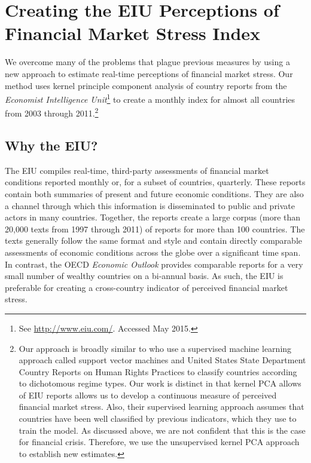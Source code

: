 \documentclass[]{article}
\begin{document}
\section{Creating the EIU Perceptions of Financial Market Stress
Index}\label{creating-the-perceptions-of-financial-market-stress-index}

We overcome many of the problems that plague previous measures by using a new approach to estimate real-time perceptions of financial market stress. Our method uses kernel principle component analysis \citep{Scholkopf1998,lodhi2002,Spirling2012} of country reports from the \emph{Economist Intelligence Unit}\footnote{See \url{http://www.eiu.com/}. Accessed May 2015.} to create a monthly index for almost all countries from 2003 through 2011.\footnote{Our approach is broadly similar to \cite{Minhas2015} who use a supervised machine learning approach called support vector machines and United States State Department Country Reports on Human Rights Practices to classify countries according to dichotomous regime types. Our work is distinct in that kernel PCA allows of EIU reports allows us to develop a continuous measure of perceived financial market stress. Also, their supervised learning approach assumes that countries have been well classified by previous indicators, which they use to train the model. As discussed above, we are not confident that this is the case for financial crisis. Therefore, we use the unsupervised kernel PCA approach to establish new estimates.}

\subsection{Why the EIU?}\label{why-the-eiu}

The EIU compiles real-time, third-party assessments of financial market conditions reported monthly or, for a subset of countries, quarterly. These reports contain both summaries of present and future economic conditions. They are also a channel through which this information is disseminated to public and private actors in many countries. Together, the reports create a large corpus (more than 20,000 texts from 1997 through 2011) of reports for more than 100 countries. The texts generally follow the same format and style and contain directly comparable assessments of economic conditions across the globe over a significant time span. In contrast, the OECD \emph{Economic Outlook} provides comparable reports for a very small number of wealthy countries on a bi-annual basis. As such, the EIU is preferable for creating a cross-country indicator of perceived financial market stress.
\end{document}
